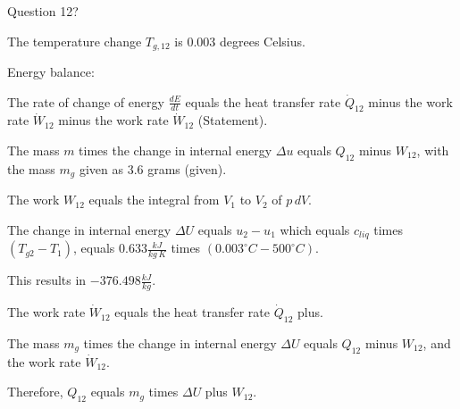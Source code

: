 Question 12?

The temperature change \( T_{g,12} \) is \( 0.003 \) degrees Celsius.

Energy balance:

The rate of change of energy \( \frac{dE}{dt} \) equals the heat transfer rate \( \dot{Q}_{12} \) minus the work rate \( \dot{W}_{12} \) minus the work rate \( \dot{W}_{12} \) (Statement).

The mass \( m \) times the change in internal energy \( \Delta u \) equals \( Q_{12} \) minus \( W_{12} \), with the mass \( m_g \) given as \( 3.6 \) grams (given).

The work \( W_{12} \) equals the integral from \( V_1 \) to \( V_2 \) of \( p \, dV \).

The change in internal energy \( \Delta U \) equals \( u_2 - u_1 \) which equals \( c_{liq} \) times \( (T_{g2} - T_1) \), equals \( 0.633 \frac{kJ}{kg \, K} \) times \( (0.003^\circ C - 500^\circ C) \).

This results in \( -376.498 \frac{kJ}{kg} \).

The work rate \( \dot{W}_{12} \) equals the heat transfer rate \( \dot{Q}_{12} \) plus.

The mass \( m_g \) times the change in internal energy \( \Delta U \) equals \( Q_{12} \) minus \( W_{12} \), and the work rate \( \dot{W}_{12} \).

Therefore, \( Q_{12} \) equals \( m_g \) times \( \Delta U \) plus \( W_{12} \).